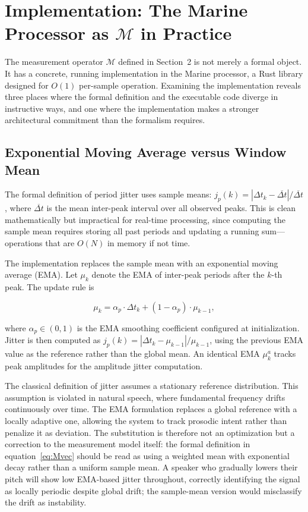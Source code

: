 \documentclass[12pt, a4paper]{article}
\begin{document}
\section{Implementation: The Marine Processor as $\mathcal{M}$ in Practice}

The measurement operator $\mathcal{M}$ defined in Section~2 is not merely a formal object. It has a concrete, running implementation in the Marine processor, a Rust library designed for $O(1)$ per-sample operation. Examining the implementation reveals three places where the formal definition and the executable code diverge in instructive ways, and one where the implementation makes a stronger architectural commitment than the formalism requires.

\subsection{Exponential Moving Average versus Window Mean}

The formal definition of period jitter uses sample means: $j_p(k) = |\Delta t_k - \overline{\Delta t}| / \overline{\Delta t}$, where $\overline{\Delta t}$ is the mean inter-peak interval over all observed peaks. This is clean mathematically but impractical for real-time processing, since computing the sample mean requires storing all past periods and updating a running sum---operations that are $O(N)$ in memory if not time.

The implementation replaces the sample mean with an exponential moving average (EMA). Let $\mu_k$ denote the EMA of inter-peak periods after the $k$-th peak. The update rule is

\begin{equation}
\mu_k = \alpha_p \cdot \Delta t_k + (1 - \alpha_p) \cdot \mu_{k-1},
\label{eq:ema}
\end{equation}

where $\alpha_p \in (0,1)$ is the EMA smoothing coefficient configured at initialization. Jitter is then computed as $j_p(k) = |\Delta t_k - \mu_{k-1}| / \mu_{k-1}$, using the previous EMA value as the reference rather than the global mean. An identical EMA $\mu^a_k$ tracks peak amplitudes for the amplitude jitter computation.

The classical definition of jitter assumes a stationary reference distribution. This assumption is violated in natural speech, where fundamental frequency drifts continuously over time. The EMA formulation replaces a global reference with a locally adaptive one, allowing the system to track prosodic intent rather than penalize it as deviation. The substitution is therefore not an optimization but a correction to the measurement model itself: the formal definition in equation~\eqref{eq:Mvec} should be read as using a weighted mean with exponential decay rather than a uniform sample mean. A speaker who gradually lowers their pitch will show low EMA-based jitter throughout, correctly identifying the signal as locally periodic despite global drift; the sample-mean version would misclassify the drift as instability.
\end{document}
